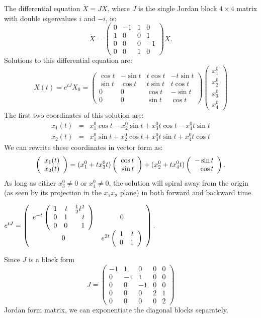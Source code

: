   The differential equation $\dot{X}=JX$, where $J$ is the 
single Jordan block $4\times 4$ matrix with double eigenvalues $i$ and $-i$,
is:
\[
\dot{X} = \left(\begin{array}{rr|rr}
 0 & -1 & 1 &  0 \\
 1 &  0 & 0 &  1 \\
\hline
 0 &  0 & 0 & -1\\
 0 &  0 & 1 &  0
\end{array}\right)X.  
\]
Solutions to this differential equation are:
\[
X(t) = e^{tJ}X_0 = \left(\begin{array}{rrrr}
  \cos t & -\sin t & t\cos t & -t\sin t\\
  \sin t &  \cos t & t\sin t &  t\cos t\\
     0   &    0    &  \cos t &  -\sin t\\
     0   &    0    &  \sin t &   \cos t  
\end{array}\right)
\left(\begin{array}{r} x_1^0 \\  x_2^0 \\ x_3^0 \\ x_4^0 \end{array}\right)
\]
The first two coordinates of this solution are:
\begin{eqnarray*}
x_1(t) & = & x_1^0\cos t - x_2^0\sin t + x_3^0t\cos t - x_4^0t\sin t\\
x_2(t) & = & x_1^0\sin t + x_2^0\cos t + x_3^0t\sin t + x_4^0t\cos t
\end{eqnarray*}
We can rewrite these coordinates in vector form as:
\[
\left(\begin{array}{r} x_1(t) \\ x_2(t)\end{array}\right) =
(x_1^0 + tx_3^0t)\left(\begin{array}{r} \cos t \\ \sin t\end{array}\right) + 
(x_2^0 + tx_4^0t)\left(\begin{array}{r} -\sin t \\ \cos t\end{array}\right).
\] 
As long as either $x_3^0\neq 0$ or $x_4^0\neq 0$, the solution will spiral 
away from the origin (as seen by its projection in the $x_1x_2$ plane) in 
both forward and backward time.

\ans $e^{tJ}= \left(\begin{array}{cc} e^{-t}\left(\begin{array}{rrr} 
 1 & t & \frac{1}{2}t^2\\ 0 & 1 & t\\ 0 & 0 & 1\end{array}\right) & 0\\ 0 &e^{2t}\left(\begin{array}{rr} 1 & t\\ 0 &1\end{array}\right)\end{array}\right)$.

\soln Since $J$ is a block form
\[
J = \left(\begin{array}{rrr|rr} 
-1 &  1 &  0 &  0 & 0 \\ 
 0 & -1 &  1 &  0 & 0 \\
 0 &  0 & -1 &  0 & 0 \\
\hline
 0 &  0 &  0 &  2 & 1 \\
 0 &  0 &  0 &  0 & 2
\end{array}\right)
\]
Jordan form matrix, we can exponentiate the diagonal blocks separately.

